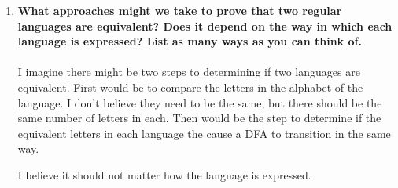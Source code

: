 \begin{enumerate}
\newpage
\item \textbf{What approaches might we take to prove that two regular languages are equivalent? Does it depend on the way in which each language is expressed? List as many ways as you can think of.}
\\\\
I imagine there might be two steps to determining  if two languages are equivalent.  First would be to compare the letters in the alphabet of the language.  I don't believe they need to be the same, but there should be the same number of letters in each.  Then would be the step to determine if the equivalent letters in each language the cause a DFA to transition in the same way.

I believe it should not matter how the language is expressed.  
		
		
\end{enumerate}


